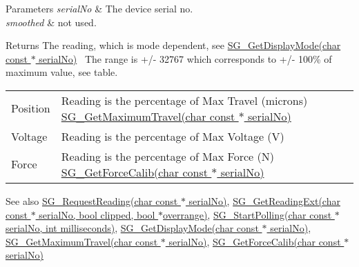 \begin{DoxyParams}{Parameters}
{\em serial\+No} & The device serial no. \\
\hline
{\em smoothed} & not used. \\
\hline
\end{DoxyParams}
\begin{DoxyReturn}{Returns}
The reading, which is mode dependent, see \hyperlink{group___t_cube_strain_gauge_gaa5b67bce46e10d40186ad1d8f3febb15}{S\+G\+\_\+\+Get\+Display\+Mode(char const $\ast$ serial\+No)}~\newline
 The range is +/-\/ 32767 which corresponds to +/-\/ 100\% of maximum value, see table. \tabulinesep=1mm
\begin{longtabu} spread 0pt [c]{*2{|X[-1]}|}
\hline
Position&Reading is the percentage of Max Travel (microns) \hyperlink{group___t_cube_strain_gauge_ga6e8ed66c10525547f088235e8505d1f6}{S\+G\+\_\+\+Get\+Maximum\+Travel(char const $\ast$ serial\+No)}  \\
Voltage&Reading is the percentage of Max Voltage (V) \\
Force&Reading is the percentage of Max Force (N) \hyperlink{group___t_cube_strain_gauge_ga9c470b12ed470678bd6e0e1fc2df3526}{S\+G\+\_\+\+Get\+Force\+Calib(char const $\ast$ serial\+No)} \\
\end{longtabu}

\end{DoxyReturn}
\begin{DoxySeeAlso}{See also}
\hyperlink{group___t_cube_strain_gauge_ga4e452fb9afe8a2a432fe642edffbb204}{S\+G\+\_\+\+Request\+Reading(char const $\ast$ serial\+No)}, \hyperlink{group___t_cube_strain_gauge_gaf24abc057f94d87f371652ef29696591}{S\+G\+\_\+\+Get\+Reading\+Ext(char const $\ast$ serial\+No, bool clipped, bool $\ast$overrange)}, \hyperlink{group___t_cube_strain_gauge_ga482455f7162dc93ed301dcb63a0fdd59}{S\+G\+\_\+\+Start\+Polling(char const $\ast$ serial\+No, int milliseconds)}, \hyperlink{group___t_cube_strain_gauge_gaa5b67bce46e10d40186ad1d8f3febb15}{S\+G\+\_\+\+Get\+Display\+Mode(char const $\ast$ serial\+No)}, \hyperlink{group___t_cube_strain_gauge_ga6e8ed66c10525547f088235e8505d1f6}{S\+G\+\_\+\+Get\+Maximum\+Travel(char const $\ast$ serial\+No)}, \hyperlink{group___t_cube_strain_gauge_ga9c470b12ed470678bd6e0e1fc2df3526}{S\+G\+\_\+\+Get\+Force\+Calib(char const $\ast$ serial\+No)}


\end{DoxySeeAlso}


